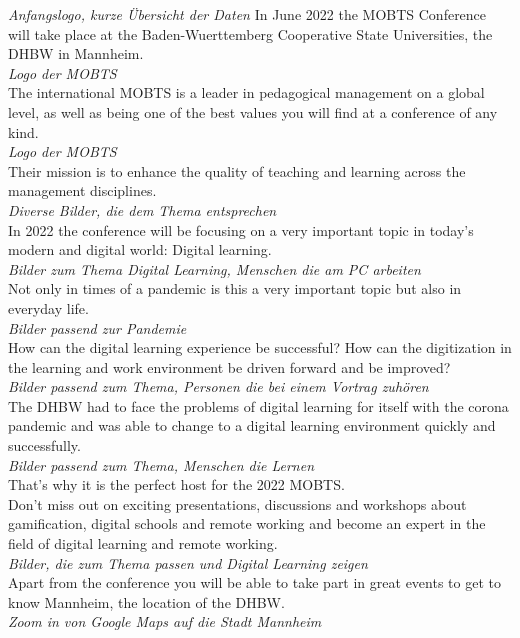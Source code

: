 \textit{Anfangslogo, kurze Übersicht der Daten}
In June 2022 the MOBTS Conference will take place at the Baden-Wuerttemberg Cooperative State Universities, the DHBW in Mannheim.\\
\textit{Logo der MOBTS}\\
The international MOBTS is a leader in pedagogical management on a global level, as well as being one of the best values you will find at a conference of any kind.\\
\textit{Logo der MOBTS}\\
Their mission is to enhance the quality of teaching and learning across the management disciplines.\\
\textit{Diverse Bilder, die dem Thema entsprechen}\\
In 2022 the conference will be focusing on a very important topic in today’s modern and digital world: Digital learning.\\
\textit{Bilder zum Thema Digital Learning, Menschen die am PC arbeiten}\\
Not only in times of a pandemic is this a very important topic but also in everyday life.\\ 
\textit{Bilder passend zur Pandemie}\\
How can the digital learning experience be successful? How can the digitization in the learning and work environment be driven forward and be improved?\\
\textit{Bilder passend zum Thema, Personen die bei einem Vortrag zuhören}\\
The DHBW had to face the problems of digital learning for itself with the corona pandemic and was able to change to a digital learning environment quickly and successfully.\\
\textit{Bilder passend zum Thema, Menschen die Lernen}\\
That’s why it is the perfect host for the 2022 MOBTS.\\
Don’t miss out on exciting presentations, discussions and workshops about gamification, digital schools and remote working and become an expert in the field of digital learning and remote working.\\
\textit{Bilder, die zum Thema passen und Digital Learning zeigen}\\
Apart from the conference you will be able to take part in great events to get to know Mannheim, the location of the DHBW.\\
\textit{Zoom in von Google Maps auf die Stadt Mannheim}\\
